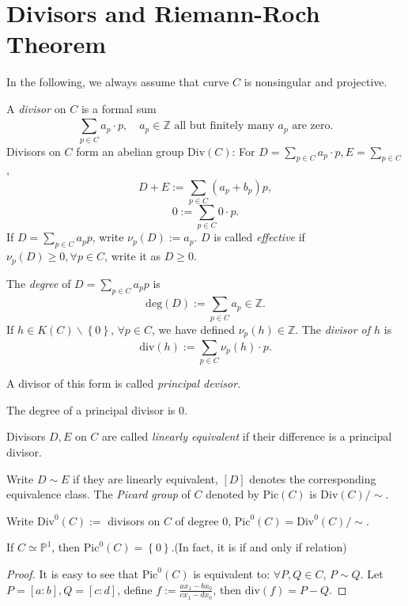 \section{Divisors and Riemann-Roch Theorem}

In the following, we always assume that curve $C$ is nonsingular and projective.
\begin{definition}
  A \textit{divisor} on $C$ is a formal sum
  \[
    \sum_{p \in C}^{} a_p \cdot p,\quad a_p\in \mathbb{Z} \text{ all but finitely many } a_p \text{ are zero}.
  \]
  Divisors on $C$ form an abelian group $\mathrm{Div}(C)$: For $D=\sum_{p\in C}a_p \cdot p,E=\sum_{p\in C}$,
  \[
    D+E:=\sum_{p \in C}^{} (a_p+b_p)p,
  \] 
  \[
    0:=\sum_{p \in C}0\cdot p.
  \] 
If $D=\sum_{p \in C}^{} a_p p$, write $\nu_p(D):=a_p$.  $D$ is called \textit{effective} if $\nu_p(D)\ge 0,\forall p \in C $, write it as $D\ge 0$.

The \textit{degree}  of $D=\sum_{p\in C}^{} a_p p$ is 
\[
  \mathrm{deg}(D):=\sum_{p \in C}^{} a_p \in \mathbb{Z}.
\] 
If $h \in K(C)\backslash \left\{0\right\} $, $\forall p \in C$, we have defined $\nu_p(h) \in \mathbb{Z}$. The \textit{divisor of $h$} is 
\[
  \mathrm{div}(h):= \sum_{p \in C}^{} \nu_p(h)\cdot p.
\] 

A divisor of this form  is called \textit{principal devisor}.
\end{definition}

\begin{theorem}\label{13-2}
  The degree of a principal divisor is $0$.
\end{theorem}
 \begin{definition}
  Divisors $D,E$ on $C$ are called \textit{linearly equivalent} if their difference is a principal divisor.

  Write $D\sim E$ if they are linearly equivalent, $[D]$ denotes the corresponding equivalence class. The \textit{Picard group}  of $C$ denoted by $\mathrm{Pic}(C)$ is $\mathrm{Div}(C) /\sim$.
\end{definition}

Write $\mathrm{Div}^0(C):=$ divisors on $C$ of degree $0$, $\mathrm{Pic}^0(C)=\mathrm{Div}^0(C) /\sim$.
\begin{proposition}
  If $C\simeq\mathbb{P}^{1}$, then $\mathrm{Pic}^{0}(C)=\left\{0\right\} $.(In fact, it is if and only if relation)
\end{proposition}

\begin{proof}
  It is easy to see that $\mathrm{Pic}^{0}(C)$ is equivalent to: $\forall P,Q \in C$, $P\sim Q$. Let $P=[a:b],Q=[c:d]$, define $f:= \frac{ax_1-bx_0}{cx_1-dx_0}$, then $\mathrm{div}(f)=P-Q$. 
\end{proof}

